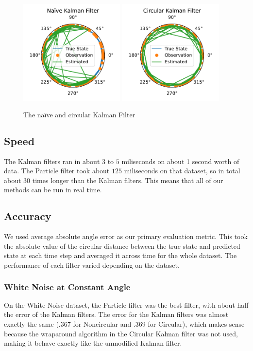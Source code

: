 \documentclass[11pt]{amsart}
\begin{document}
\begin{figure}[htp]
    \centering
    \includegraphics[width=0.47\textwidth]{non_altered_kalman.pdf}\hfill
    \includegraphics[width=0.47\textwidth]{altered_kalman.pdf}\hfill
    \caption{The naïve and circular Kalman Filter}
    \label{fig:simple_kalman}
\end{figure}

\subsection{Speed}
The Kalman filters ran in about $3$ to $5$ miliseconds on about 1 second worth of data. The Particle filter took about $125$ miliseconds on that dataset, so in total about $30$ times longer than the Kalman filters.
This means that all of our methods can be run in real time. 
\subsection{Accuracy}
We used average absolute angle error as our primary evaluation metric. This took the absolute value of the circular distance between the true state and predicted state at each time step and averaged it across time for the whole dataset. The performance of each filter varied depending on the dataset.
\subsubsection{White Noise at Constant Angle}
On the White Noise dataset, the Particle filter was the best filter, with about half the error of the Kalman filters. The error for the Kalman filters was almost exactly the same (.367 for Noncircular and .369 for Circular), which makes sense because the wraparound algorithm in the Circular Kalman filter was not used, making it behave exactly like the unmodified Kalman filter.
\end{document}
